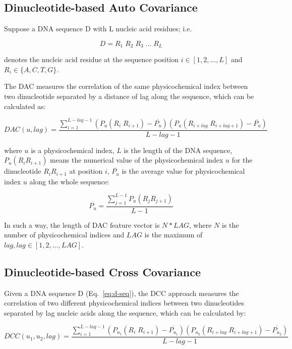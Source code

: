 \subsection{Dinucleotide-based Auto Covariance}

Suppose a DNA sequence D with L nucleic acid residues; i.e. 

\begin{equation}\label{eq:d-seq}
    D = R_{1}\;R_{2}\;R_{3}\;...\;R_{L}
\end{equation}

denotes the nucleic acid residue at the sequence position $i \in [1,2,...,L]$ and $R_{i} \in \lbrace A,C,T,G\rbrace$.

The \gls{DAC} measures the correlation of the same physicochemical index between two dinucleotide separated by a distance of lag along the sequence, which can be calculated as:

\begin{equation}\label{eq:DAC}
    DAC(u,lag) = \frac{\sum_{i=1}^{L-lag-1}(P_{u}(R_{i}\;R_{i+1}) - \overline{P_{u}})(P_{u}(R_{i+lag}\;R_{i+lag+1}) - \overline{P_{u}})}{L-lag-1}
\end{equation}

where $u$ is a physicochemical index, $L$ is the length of the DNA sequence, $P_{u}(R_{i}R_{i+1})$ means the numerical value of the physicochemical index $u$ for the dinucleotide $R_{i}R_{i+1}$ at position $i$, $\overline{P_{u}}$ is the average value for physicochemical index $u$ along the whole sequence:

\begin{equation}\label{eq:DAC-PU}
    \overline{P_{u}} = \frac{\sum_{j=1}^{L-1}P_{u}(R_{j}R_{j+1})}{L-1}
\end{equation}

In such a way, the length of \gls{DAC} feature vector is $N*LAG$, where $N$ is the number of physicochemical indices and $LAG$ is the maximum of $lag, lag \in [1,2,...,LAG]$.

\subsection{Dinucleotide-based Cross Covariance}
Given a DNA sequence D (Eq.~\ref{eq:d-seq}), the \gls{DCC} approach measures the correlation of two different physicochemical indices between two dinucleotides separated by lag nucleic acids along the sequence, which can be calculated by:

\begin{equation}\label{eq:DCC}
    DCC(u_{1},u_{2},lag) = \frac{\sum_{i=1}^{L-lag-1}(P_{u_{1}}(R_{i}\;R_{i+1}) - \overline{P_{u_{1}}})(P_{u_{2}}(R_{i+lag}\;R_{i+lag+1}) - \overline{P_{u_{2}}})}{L-lag-1}
\end{equation}

